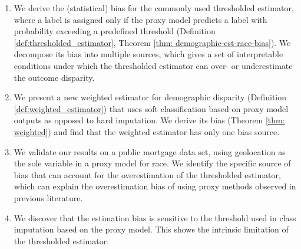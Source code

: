 \begin{enumerate}
\item
We derive the (statistical) bias for the commonly used thresholded estimator, where a label is assigned only if the proxy model predicts a label with probability exceeding a predefined threshold \cite{CFPB:proxy2014,Baines:2014aa,zhang2016assessing} (Definition \ref{def:thresholded_estimator}, Theorem \ref{thm: demographic-est-race-bias}). We decompose its bias into multiple sources, which gives a set of interpretable conditions under which the thresholded estimator can over- or underestimate the outcome disparity.

\item
We present a new weighted estimator for demographic disparity (Definition \ref{def:weighted_estimator}) that uses soft classification based on proxy model outputs as opposed to hard imputation. We derive its bias (Theorem \ref{thm: weighted}) and find that the weighted estimator has only one bias source.


\item
We validate our results on a public mortgage data set, using geolocation as the sole variable in a proxy model for race.
We identify the specific source of bias that can account for the overestimation of the thresholded estimator, which can explain the overestimation bias of using proxy methods observed in previous literature.
\item
We discover that the estimation bias is sensitive to the threshold used in class imputation based on the proxy model. This shows the intrinsic limitation of the thresholded estimator.
\end{enumerate}




